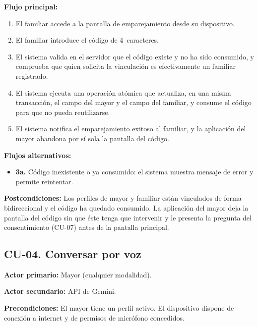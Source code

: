 \noindent\textbf{Flujo principal:}
\begin{enumerate}[nosep]
    \item El familiar accede a la pantalla de emparejamiento desde su dispositivo.
    \item El familiar introduce el código de 4~caracteres.
    \item El sistema valida en el servidor que el código existe y no ha sido consumido, y comprueba que
    quien solicita la vinculación es efectivamente un familiar registrado.
    \item El sistema ejecuta una operación atómica que actualiza, en una misma transacción, el campo
     del mayor y el campo  del familiar, y consume el código
    para que no pueda reutilizarse.
    \item El sistema notifica el emparejamiento exitoso al familiar, y la aplicación del mayor abandona
    por sí sola la pantalla del código.
\end{enumerate}

\noindent\textbf{Flujos alternativos:}
\begin{itemize}[nosep]
    \item \textbf{3a.} Código inexistente o ya consumido: el sistema muestra mensaje de error y permite
    reintentar.
\end{itemize}

\noindent\textbf{Postcondiciones:} Los perfiles de mayor y familiar están vinculados de forma
bidireccional y el código ha quedado consumido. La aplicación del mayor deja la pantalla del código sin
que éste tenga que intervenir y le presenta la pregunta del consentimiento (CU-07) antes de la pantalla
principal.

\bigskip

\subsection*{CU-04. Conversar por voz}

\noindent\textbf{Actor primario:} Mayor (cualquier modalidad).

\noindent\textbf{Actor secundario:} API de Gemini.

\noindent\textbf{Precondiciones:} El mayor tiene un perfil activo. El dispositivo dispone de conexión a
internet y de permisos de micrófono concedidos.

